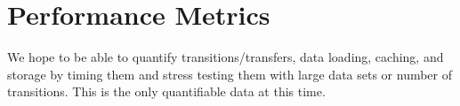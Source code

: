 \documentclass[letterpaper,10pt,draftclsnofoot,onecolumn]{IEEEtran}
\begin{document}
\section*{\newline Performance Metrics}
We hope to be able to quantify transitions/transfers, data loading, caching, and storage by timing them and stress testing them with large data sets or number of transitions. This is the only quantifiable data at this time.

\nocite{*}


\end{document}
